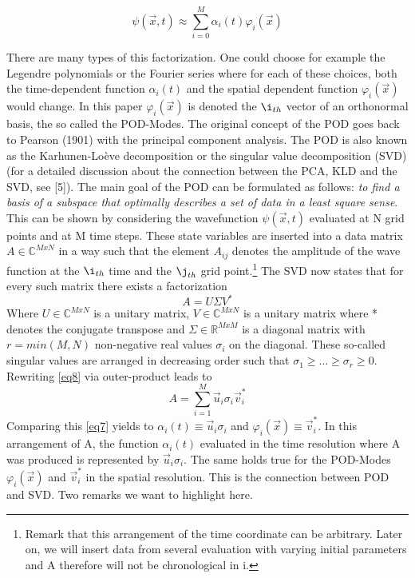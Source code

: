 \documentclass[usenatbib]{mn2e}
\begin{document}
\begin{equation}\label{eq7}
\psi( \overrightarrow {x},t) \approx \sum_{i=0}^M \alpha_i(t) \varphi_i(\overrightarrow{x}) 
\end{equation} 

There are many types of this factorization. One could choose for example the Legendre polynomials or the Fourier series where for each of these choices, both the time-dependent function \(\alpha_i(t)\) and the spatial dependent function \(\varphi_i(\overrightarrow{x})\) would change. In this paper \(\varphi_i(\overrightarrow{x})\) is denoted the \(\i_{th}\) vector of an orthonormal basis, the so called the POD-Modes. The original concept of the POD goes back to Pearson (1901) with the principal component analysis. The POD is also known as the Karhunen-Loève decomposition or the singular value decomposition (SVD) (for a detailed discussion about the connection between the PCA, KLD and the SVD, see [5]). The main goal of the POD can be formulated as follows: \textit{to find a basis of a subspace that optimally describes a set of data in a least square sense}. \\
This can be shown by considering the wavefunction  \(\psi( \overrightarrow {x},t)\) evaluated at N grid points and at M time steps. These state variables are inserted into a data matrix \(A \in \mathbb{C}^{MxN}\) in a way such that the element \(A_{ij}\) denotes the amplitude of the wave function at the \(\i_{th}\) time and the \(\j_{th}\) grid point.\footnote{Remark that this arrangement of the time coordinate can be arbitrary. Later on, we will insert data from several evaluation with varying initial parameters and A therefore will not be chronological in i.}
The SVD now states that for every such matrix there exists a factorization
\begin{equation}\label{eq8}
A=U\Sigma V^*
\end{equation} 
Where \(U \in \mathbb{C}^{MxN} \) is a unitary matrix, \(V \in \mathbb{C}^{MxN} \) is a unitary matrix where * denotes the conjugate transpose and \(\Sigma \in \mathbb{R}^{MxM} \) is a diagonal matrix with \(r=min(M,N)\) non-negative real values \(\sigma_i\) on the diagonal. These so-called singular values are arranged in decreasing order such that \(\sigma_1 \geq \dots \geq \sigma_r \geq 0\). Rewriting \ref{eq8} via outer-product leads to 
\begin{equation}\label{eq9}
A=\sum_{i=1}^M \overrightarrow{u}_i \sigma_i \overrightarrow{v}_i^*
\end{equation} 
Comparing this \ref{eq7} yields to \(\alpha_i(t) \equiv \overrightarrow{u}_i \sigma_i \) and \(\varphi_i(\overrightarrow{x}) \equiv \overrightarrow{v}_i^*\). In this arrangement of A, the function \(\alpha_i(t)\) evaluated in the time resolution where A was produced is represented by \(\overrightarrow{u}_i \sigma_i \). The same holds true for the POD-Modes \(\varphi_i(\overrightarrow{x})\) and \(\overrightarrow{v}_i^*\) in the spatial resolution. This is the connection between POD and SVD. Two remarks we want to highlight here.
\end{document}
